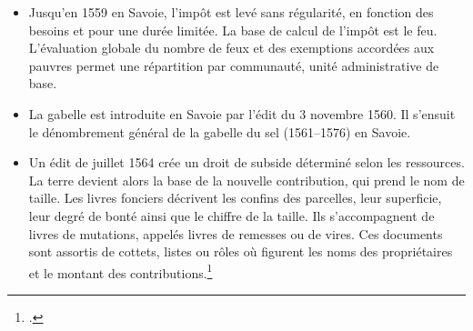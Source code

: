 \documentclass[12pt,a4paper]{report}
\begin{document}
\begin{itemize}
\begin{quote}
	Ce notaire collégié et secrétaire de la communauté de Saint-Maxime comme il s'intitule, ne laisse que fort peu de pouvoirs au châtelain. 
	
	(*)Le secrétaire insinuateur est chargé d'enregistrer les actes. Pour exercer cette charge à perpétuité et à titre héréditaire il faut disposer de biens équivalent à mille écus d'or. Joseph Blanc achète cette fonction en 1754. Il l'exerce jusqu'en 1782, date de sa mort, il est alors remplacé par son fils Michel.
	
	(**)A partir de 1782, Michel Blanc cumule les fonctions de secrétaire-insinuateur et de secrétaire-notaire. Pour l'aider, en juillet 1784, son cousin, le notaire Jean-Baptiste Blanc, est nommé « exécutant » à l'office de secrétairerie. Cette fonction est révocable. (A.C. BB 3 p. 194).»		
	\footcite[p.~22]{BordeVibertGuigue1971VieRuraleBeaufort}
\end{quote}


\section*{Cadre fiscal}
	


	\begin{quote}
		« La prospérité de 1561 n'avait pas disparu puisqu'en 1574, la communauté put s'affranchir globalement de la taillabilité personnelle envers Mgr de Savoie-Nemours. 543 personnes et leurs familles se libérèrent de ce lien au prix de 16 000 florins et 100 écus d'or, somme payée avec une facilité éloquente par les syndics. »
		\footcite[32]{HViallet1993}
	\end{quote}
	 
	\item Jusqu’en 1559 en Savoie, l’impôt est levé sans régularité, en fonction des besoins et pour une durée limitée. La base de calcul de l’impôt est le feu. L’évaluation globale du nombre de feux et des exemptions accordées aux pauvres permet une répartition par communauté, unité administrative de base.

	\item La gabelle est introduite en Savoie par l’édit du 3 novembre 1560. Il s’ensuit le dénombrement général de la gabelle du sel (1561--1576) en Savoie.	\item Un édit de juillet 1564 crée un droit de subside déterminé selon les ressources. La terre devient alors la base de la nouvelle contribution, qui prend le nom de taille. Les livres fonciers décrivent les confins des parcelles, leur superficie, leur degré de bonté ainsi que le chiffre de la taille. Ils s’accompagnent de livres de mutations, appelés livres de remesses ou de vires. Ces documents sont assortis de cottets, listes ou rôles où figurent les noms des propriétaires et le montant des contributions.\footcite[272]{HVialletSel}
	

\end{itemize}
\end{document}
